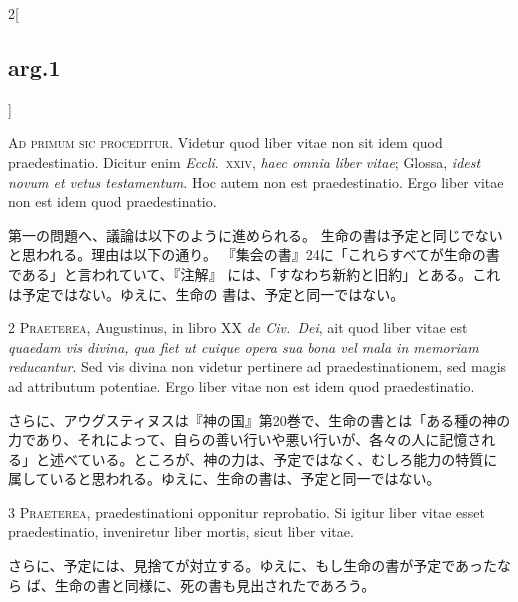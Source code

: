 \documentclass[paper=a4paper,fontsize=10pt,jafontsize=9pt,titlepage]{jlreq}
\begin{document}
\begin{paracol}{2}[\subsection{arg.1}]

{\Huge A}{\scshape d primum sic proceditur}. Videtur quod liber vitae
 non sit idem quod praedestinatio. Dicitur enim {\itshape Eccli}.~{\scshape xxiv}, {\itshape haec omnia
 liber vitae}; Glossa, {\itshape idest novum et vetus testamentum}. Hoc autem non
 est praedestinatio. Ergo liber vitae non est idem quod praedestinatio.

\switchcolumn

第一の問題へ、議論は以下のように進められる。
生命の書は予定と同じでないと思われる。理由は以下の通り。
『集会の書』24に「これらすべてが生命の書である」と言われていて、『注解』
 には、「すなわち新約と旧約」とある。これは予定ではない。ゆえに、生命の
 書は、予定と同一ではない。


{\scshape 2 Praeterea}, Augustinus, in libro XX {\itshape de
 Civ.~Dei}, ait quod liber vitae est {\itshape quaedam vis divina, qua fiet ut
 cuique opera sua bona vel mala in memoriam reducantur}. Sed vis divina
 non videtur pertinere ad praedestinationem, sed magis ad attributum
 potentiae. Ergo liber vitae non est idem quod praedestinatio.

\switchcolumn

さらに、アウグスティヌスは『神の国』第20巻で、生命の書とは「ある種の神の
 力であり、それによって、自らの善い行いや悪い行いが、各々の人に記憶され
 る」と述べている。ところが、神の力は、予定ではなく、むしろ能力の特質に
 属していると思われる。ゆえに、生命の書は、予定と同一ではない。


{\scshape 3 Praeterea}, praedestinationi opponitur
 reprobatio. Si igitur liber vitae esset praedestinatio, inveniretur
 liber mortis, sicut liber vitae.

\switchcolumn

さらに、予定には、見捨てが対立する。ゆえに、もし生命の書が予定であったなら
 ば、生命の書と同様に、死の書も見出されたであろう。


\end{paracol}
\end{document}
